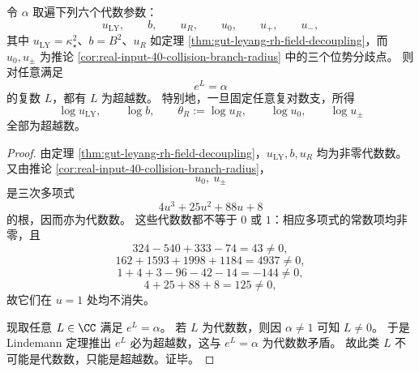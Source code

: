 \begin{corollary}[临界代数尺度的全部对数提升皆为超越数]\label{cor:gut-critical-log-lifts-transcendental}
令 \(\alpha\) 取遍下列六个代数参数：
\[
u_{\mathrm{LY}},\qquad b,\qquad u_R,\qquad u_0,\qquad u_+,\qquad u_-,
\]
其中 \(u_{\mathrm{LY}}=\kappa_\star^2\)、\(b=B^2\)、\(u_R\) 如定理 \ref{thm:gut-leyang-rh-field-decoupling}，而 \(u_0,u_\pm\) 为推论 \ref{cor:real-input-40-collision-branch-radius} 中的三个位势分歧点。
则对任意满足
\[
e^{L}=\alpha
\]
的复数 \(L\)，都有 \(L\) 为超越数。
特别地，一旦固定任意复对数支，所得
\[
\log u_{\mathrm{LY}},\qquad \log b,\qquad \theta_R:=\log u_R,\qquad \log u_0,\qquad \log u_\pm
\]
全部为超越数。
\end{corollary}
\begin{proof}
由定理 \ref{thm:gut-leyang-rh-field-decoupling}，\(u_{\mathrm{LY}},b,u_R\) 均为非零代数数。
又由推论 \ref{cor:real-input-40-collision-branch-radius}，
\[
u_0,\ u_\pm
\]
是三次多项式
\[
4u^3+25u^2+88u+8
\]
的根，因而亦为代数数。
这些代数数都不等于 \(0\) 或 \(1\)：相应多项式的常数项均非零，且
\[
324-540+333-74=43\neq 0,
\]
\[
162+1593+1998+1184=4937\neq 0,
\]
\[
1+4+3-96-42-14=-144\neq 0,
\]
\[
4+25+88+8=125\neq 0,
\]
故它们在 \(u=1\) 处均不消失。
\par
现取任意 \(L\in\CC\) 满足 \(e^{L}=\alpha\)。
若 \(L\) 为代数数，则因 \(\alpha\neq 1\) 可知 \(L\neq 0\)。
于是 Lindemann 定理推出 \(e^{L}\) 必为超越数，这与 \(e^{L}=\alpha\) 为代数数矛盾。
故此类 \(L\) 不可能是代数数，只能是超越数。证毕。
\end{proof}


